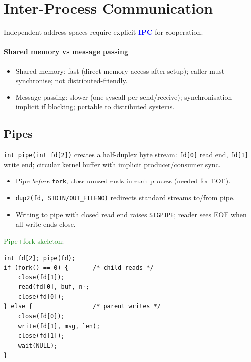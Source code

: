 \section{Inter-Process Communication}
Independent address spaces require explicit \textcolor{Blue}{\textbf{IPC}} for cooperation.

\paragraph{Shared memory vs message passing}
\begin{itemize}
  \item \textcolor{Bittersweet}{Shared memory}: fast (direct memory access after setup); caller must synchronise; not distributed-friendly.
  \item \textcolor{Bittersweet}{Message passing}: slower (one syscall per send/receive); synchronisation implicit if blocking; portable to distributed systems.
\end{itemize}

\subsection{Pipes}
\texttt{int \textcolor{Bittersweet}{pipe}(int fd[2])} creates a half-duplex byte stream: \texttt{fd[0]} read end, \texttt{fd[1]} write end; circular kernel buffer with implicit producer/consumer sync.
\begin{center}
\end{center}
\begin{itemize}
  \item Pipe \emph{before} \texttt{fork}; close unused ends in each process (needed for EOF).
  \item \texttt{\textcolor{Bittersweet}{dup2}(fd, STDIN/OUT\_FILENO)} redirects standard streams to/from pipe.
  \item Writing to pipe with closed read end raises \texttt{SIGPIPE}; reader sees EOF when all write ends close.
\end{itemize}
\textcolor{ForestGreen}{Pipe+fork skeleton}:
\begin{verbatim}
int fd[2]; pipe(fd);
if (fork() == 0) {       /* child reads */
    close(fd[1]);
    read(fd[0], buf, n);
    close(fd[0]);
} else {                 /* parent writes */
    close(fd[0]);
    write(fd[1], msg, len);
    close(fd[1]);
    wait(NULL);
}
\end{verbatim}

